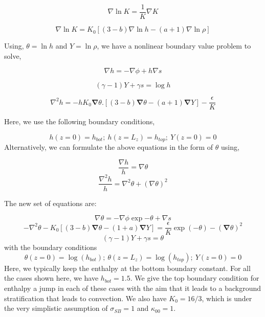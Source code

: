 \documentclass{aastex631}
\newcommand{\del}{\nabla}
\renewcommand{\vec}{\boldsymbol}
\newcommand{\grad}{\vec{\del}}
\begin{document}
\begin{equation}
    \del \ln{K} = \dfrac{1}{K} \del K 
\end{equation}

\begin{equation}
    \del \ln{K} = K_{0} [(3-b)\del \ln{h} - (a+1)\del \ln{\rho} ]
\end{equation}

Using, $\theta = \ln{h}$ and $Y=\ln{\rho}$, we have a nonlinear boundary value problem to solve,

\begin{equation}
    \del h = - \del \phi+ h \del s 
\end{equation}

\begin{equation}
    (\gamma-1)Y + \gamma s = \log h
\end{equation}

\begin{equation}
 \del^{2}h = - h K_{0} \grad \theta . [(3-b)\grad \theta - (a+1)\grad Y] -\dfrac{\epsilon}{K}
\end{equation}

Here, we use the following boundary conditions,

\begin{equation}
    h(z=0) = h_{bot};~ h(z=L_{z}) = h_{top};~ Y(z=0) = 0
\end{equation}
Alternatively, we can formulate the above equations in the form of $\theta$ using,

\begin{equation}
    \dfrac{\del h}{h} = \del \theta
\end{equation}
\begin{equation}
    \dfrac{\del^{2} h}{h} = \del^{2}\theta + (\del \theta)^{2}
\end{equation}

The new set of equations are:

\begin{equation}
    \del \theta = -\del \phi \exp{-\theta} + \del s
\end{equation}
\begin{equation}
    -\del^{2} \theta - K_{0} [(3-b)\grad \theta - (1+a)\grad Y] = \dfrac{\epsilon}{K}\exp{(-\theta)} - (\grad \theta)^{2}
\end{equation}
\begin{equation}
    (\gamma - 1)Y + \gamma s = \theta
\end{equation}
with the boundary conditions
\begin{equation}
    \theta (z=0) = \log (h_{bot});~\theta (z=L_{z}) = \log (h_{top});~Y(z=0)=0
\end{equation}
Here, we typically keep the enthalpy at the bottom boundary constant. For all the cases shown here, we have $h_{bot}=1.5$. We give the top boundary condition for enthalpy a jump in each of these cases with the aim that it leads to a background stratification that leads to convection. We also have $K_{0}=16/3$, which is under the very simplistic assumption of $\sigma_{SB}=1$ and $\kappa_{00}=1$.
\end{document}
